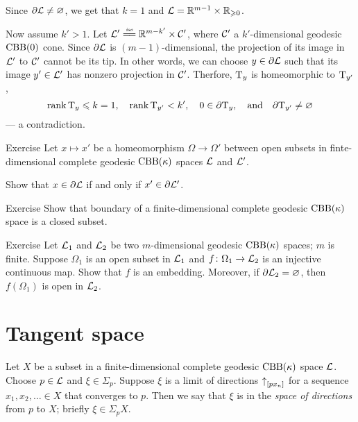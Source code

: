 Since $\partial \mathcal{L}\ne \varnothing$, we get that $k=1$ and $\mathcal{L}=\mathbb{R}^{m-1}\times\mathbb{R}_{\geqslant0}$.

Now assume $k'> 1$.
Let $\spc{L}'\iso \RR^{m-k'}\times \spc{C}'$, where $\mathcal{C}'$ a $k'$-dimensional geodesic $\mathrm{CBB}(0)$ cone.
Since $\partial\mathcal{L}$ is $(m-1)$-dimensional,
the projection of its image in $\mathcal{L}'$ to $\mathcal{C}'$
cannot be its tip.
In other words, we can choose $y\in \partial \mathcal{L}$ such that its image $y'\in \mathcal{L}'$ has nonzero projection in $\mathcal{C}'$.
Therfore, $\mathrm{T}_y$ is homeomorphic to $\mathrm{T}_{y'}$, 
\[\operatorname{\rm rank}\nolimits\mathrm{T}_y\leqslant k=1,
\quad
\operatorname{\rm rank}\nolimits\mathrm{T}_{y'}< k',
\quad
0\in \partial \mathrm{T}_y,
\quad\text{and}\quad
\partial \mathrm{T}_{y'}\ne \varnothing\]
--- a contradiction.
\qeds

\begin{thm}{Exercise}\label{ex:bry2bry}
Let $x\mapsto x'$ be a homeomorphism $\Omega\to\Omega'$
between open subsets in finte-dimensional complete geodesic $\mathrm{CBB}(\kappa)$ spaces $\mathcal{L}$ and $\mathcal{L}'$.

Show that $x\in \partial \mathcal{L}$ if and only if $x'\in \partial \mathcal{L}'$.

\end{thm}

\begin{thm}{Exercise}\label{ex:bry-closed}
Show that boundary of a finite-dimensional complete geodesic $\mathrm{CBB}(\kappa)$ space is a closed subset.
\end{thm}

\begin{thm}{Exercise}
Let $\mathcal{L}_1$ and $\mathcal{L}_2$ be two $m$-dimensional geodesic $\mathrm{CBB}(\kappa)$ spaces; $m$ is finite.
Suppose $\Omega_1$ is an open subset in $\mathcal{L}_1$ and $f\colon\Omega_1\to \mathcal{L}_2$ is an injective continuous map.
Show that $f$ is an embedding.
Moreover, if $\partial\mathcal{L}_2=\varnothing$, then $f(\Omega_1)$ is open in $\mathcal{L}_2$.  
\end{thm}

\section{Tangent space}

Let $X$ be a subset in a finite-dimensional complete geodesic $\mathrm{CBB}(\kappa)$ space $\mathcal{L}$.
Choose $p\in \mathcal{L}$ and $\xi\in \Sigma_p$.
Suppose $\xi$ is a limit of directions ${\uparrow}_{[{p}{x_n}]}$ for a sequence $x_1,x_2,\dots{}\in X$ that converges to $p$.
Then we say that $\xi$ is in the \emph{space of directions} from $p$ to $X$; briefly $\xi\in\Sigma_pX$.


